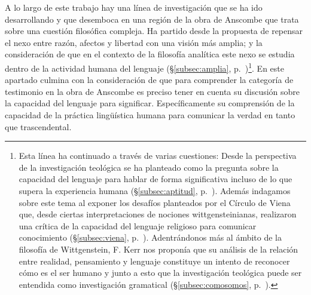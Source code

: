 A lo largo de este trabajo hay una línea de investigación que se ha ido desarrollando y que desemboca en una región de la obra de Anscombe que trata sobre una cuestión filosófica compleja. Ha partido desde la propuesta de repensar el nexo entre razón, afectos y libertad con una visión más amplia; y la consideración de que en el contexto de la filosofía analítica este nexo se estudia dentro de la actividad humana del lenguaje (\S\ref{subsec:amplia}, p.~\pageref{subsec:amplia})\footnote{Esta línea ha continuado a través de varias cuestiones: Desde la perspectiva de la investigación teológica se ha planteado como la pregunta sobre la capacidad del lenguaje para hablar de forma significativa incluso de lo que supera la experiencia humana (\S\ref{subsec:aptitud}, p.~\pageref{subsec:aptitud}). Además indagamos sobre este tema al exponer los desafíos planteados por el Círculo de Viena que, desde ciertas interpretaciones de nociones wittgensteinianas, realizaron una crítica de la capacidad del lenguaje religioso para comunicar conocimiento (\S\ref{subsec:viena}, p.~\pageref{subsec:viena}). Adentrándonos más al ámbito de la filosofía de Wittgenstein, F. Kerr nos proponía que su análisis de la relación entre realidad, pensamiento y lenguaje constituye un intento de reconocer cómo es el ser humano y junto a esto que la investigación teológica puede ser entendida como investigación gramatical (\S\ref{subsec:comosomos}, p.~\pageref{subsec:comosomos}).}. En este apartado culmina con la consideración de que para comprender la categoría de testimonio en la obra de Anscombe es preciso tener en cuenta su discusión sobre la capacidad del lenguaje para significar. Específicamente su comprensión de la capacidad de la práctica lingüística humana para comunicar la verdad en tanto que trascendental. 

